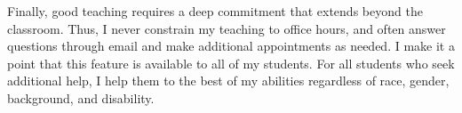\documentclass[a4paper,11pt]{article}
\begin{document}
Finally, good teaching requires a deep commitment that extends beyond the classroom. Thus, I never constrain my teaching to office hours, and often answer questions through email and make additional appointments as needed. I make it a point that this feature is available to all of my students. For all students who seek additional help, I help them to the best of my abilities regardless of race, gender, background, and disability.
\end{document}

